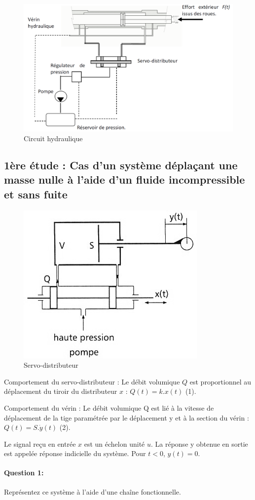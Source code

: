 \begin{figure}[!h]
 \centering\includegraphics[width=0.7\linewidth]{img/diravi3.png}
 \caption{Circuit hydraulique}
 \label{diravi3}
\end{figure}

\subsection{1ère étude : Cas d'un système déplaçant une masse nulle à l'aide d'un fluide incompressible et sans fuite}

\begin{figure}[!h]
 \centering\includegraphics[width=0.4\linewidth]{img/diravi4.png}
 \caption{Servo-distributeur}
 \label{diravi4}
\end{figure}

Comportement du servo-distributeur : Le débit volumique $Q$ est proportionnel au déplacement du tiroir du distributeur $x$ : $Q(t)=k.x(t)$ (1).

Comportement du vérin : Le débit volumique Q est lié à la vitesse de déplacement de la tige paramétrée par le
déplacement y et à la section du vérin : $Q(t)=S.\dot{y}(t)$ (2).

Le signal reçu en entrée $x$ est un échelon unité $u$. La réponse y obtenue en sortie est appelée réponse indicielle du système. Pour $t<0$, $y(t)=0$.

\paragraph{Question 1:} Représentez ce système à l'aide d'une chaîne fonctionnelle.

